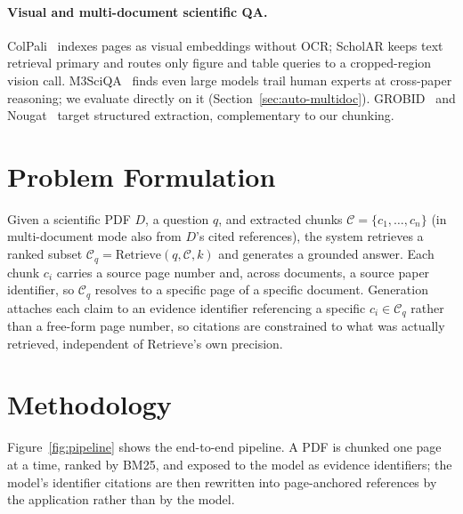 \documentclass[letterpaper]{article} %
\begin{document}
\paragraph{Visual and multi-document scientific QA.}
ColPali~\citep{faysse2024colpali} indexes pages as visual embeddings without OCR; ScholAR keeps
text retrieval primary and routes only figure and table queries to a cropped-region vision call.
M3SciQA~\citep{li2024m3sciqa} finds even large models trail human experts at cross-paper reasoning;
we evaluate directly on it (Section~\ref{sec:auto-multidoc}). GROBID~\citep{lopez2009grobid} and
Nougat~\citep{blecher2023nougat} target structured extraction, complementary to our chunking.

\section{Problem Formulation}
Given a scientific PDF $D$, a question $q$, and extracted chunks
$\mathcal{C} = \{c_1, \ldots, c_n\}$ (in multi-document mode also from $D$'s cited references), the
system retrieves a ranked subset $\mathcal{C}_q = \mathrm{Retrieve}(q, \mathcal{C}, k)$ and
generates a grounded answer. Each chunk $c_i$ carries a source page number and, across documents, a
source paper identifier, so $\mathcal{C}_q$ resolves to a specific page of a specific document.
Generation attaches each claim to an evidence identifier referencing a specific
$c_i \in \mathcal{C}_q$ rather than a free-form page number, so citations are constrained to what
was actually retrieved, independent of $\mathrm{Retrieve}$'s own precision.

\section{Methodology}
Figure~\ref{fig:pipeline} shows the end-to-end pipeline. A PDF is chunked one page
at a time, ranked by BM25, and exposed to the model as evidence identifiers; the
model's identifier citations are then rewritten into page-anchored references by the
application rather than by the model.
\end{document}
